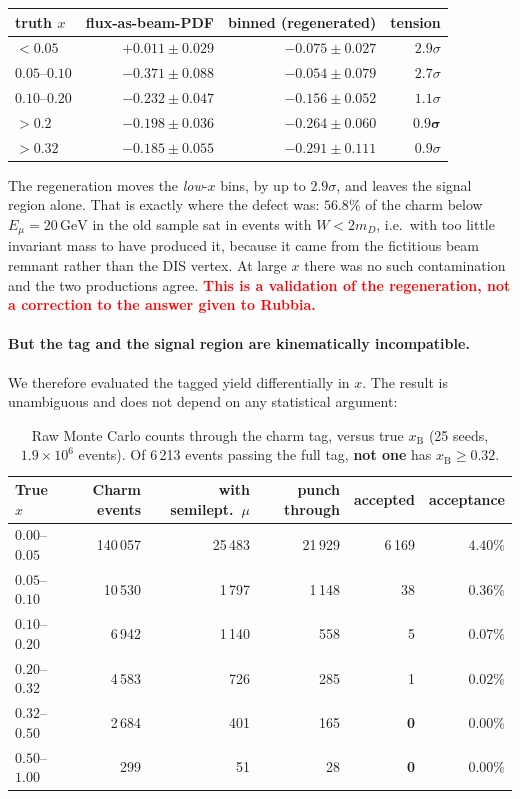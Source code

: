 \documentclass[11pt,a4paper]{article}
\newcommand{\xB}{x_{\mathrm{B}}}
\newcommand{\GeV}{\,\mathrm{GeV}}
\newcommand{\note}[1]{\textcolor{red}{\textbf{#1}}}
\begin{document}
\begin{center}\small
\begin{tabular}{lrrr}
\toprule
truth $x$ & flux-as-beam-PDF & binned (regenerated) & tension \\
\midrule
$<0.05$        & $+0.011\pm0.029$ & $-0.075\pm0.027$ & $2.9\sigma$ \\
$0.05$--$0.10$ & $-0.371\pm0.088$ & $-0.054\pm0.079$ & $2.7\sigma$ \\
$0.10$--$0.20$ & $-0.232\pm0.047$ & $-0.156\pm0.052$ & $1.1\sigma$ \\
$\mathbf{>0.2}$ & $\mathbf{-0.198\pm0.036}$ & $\mathbf{-0.264\pm0.060}$ & $\mathbf{0.9\sigma}$ \\
$>0.32$        & $-0.185\pm0.055$ & $-0.291\pm0.111$ & $0.9\sigma$ \\
\bottomrule
\end{tabular}
\end{center}

\noindent
The regeneration moves the \emph{low}-$x$ bins, by up to $2.9\sigma$, and leaves
the signal region alone. That is exactly where the defect was: $56.8\%$ of the
charm below $E_\mu=20\GeV$ in the old sample sat in events with $W<2m_D$, i.e.\
with too little invariant mass to have produced it, because it came from the
fictitious beam remnant rather than the DIS vertex. At large $x$ there was no
such contamination and the two productions agree. \note{This is a validation of
the regeneration, not a correction to the answer given to Rubbia.}

\paragraph{But the tag and the signal region are kinematically incompatible.}
We therefore evaluated the tagged yield differentially in $x$. The result is
unambiguous and does not depend on any statistical argument:

\begin{table}[htbp]
\centering\small
\begin{tabular}{lrrrrr}
\toprule
True $x$ & Charm events & with semilept.\ $\mu$ & punch through & \textbf{accepted} & acceptance \\
\midrule
$0.00$--$0.05$ & 140\,057 & 25\,483 & 21\,929 & 6\,169 & $4.40\%$ \\
$0.05$--$0.10$ & 10\,530 & 1\,797 & 1\,148 & 38 & $0.36\%$ \\
$0.10$--$0.20$ & 6\,942 & 1\,140 & 558 & 5 & $0.07\%$ \\
$0.20$--$0.32$ & 4\,583 & 726 & 285 & 1 & $0.02\%$ \\
$0.32$--$0.50$ & 2\,684 & 401 & 165 & \textbf{0} & $\mathbf{0.00\%}$ \\
$0.50$--$1.00$ & 299 & 51 & 28 & \textbf{0} & $\mathbf{0.00\%}$ \\
\bottomrule
\end{tabular}
\caption{Raw Monte Carlo counts through the charm tag, versus true $\xB$
(25 seeds, $1.9\times10^6$ events). Of 6\,213 events passing the full tag,
\textbf{not one} has $\xB\geq0.32$.}
\label{tab:acceptance}
\end{table}
\end{document}
